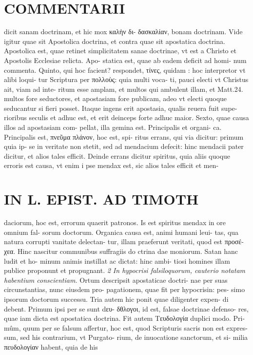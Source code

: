 \documentclass{article}
\begin{document}
\begin{pages}
\section*{COMMENTARII }
\marginpar{[ p.86 ]}\pstart dicit sanam doctrinam, et hic mox καλὴν δι- δασκαλίαν, bonam doctrinam. Vide igitur quae sit Apostolica doctrina, et contra quae sit apostatica doctrina. Apostolica est, quae retinet simplicitatem sanae doctrinae, vt est a Christo et Apostolis Ecclesiae relicta. Apo- statica est, quae ab eadem deficit ad homi- num commenta.  \pend\pstart Quinto, qui hoc facient? respondet, τίνες, quidam : hoc interpretor vt alibi loqui- tur Scriptura per πολλοὺς: quia multi voca- ti, pauci electi vt Christus ait, viam ad inte- ritum esse amplam, et multos qui ambulent illam, et Matt.24. multos fore seductores, et apostasiam fore publicam, adeo vt electi quoque seducantur si fieri posset. Itaque ingens erit apostasia, qualis reuera fuit supe- rioribus seculis et adhuc est, et erit deinceps forte adhuc maior.  \pend\pstart Sexto, quae causa illos ad apostasiam com- pellat, illa gemina est. Principalis et organi- ca. Principalis est, πνεῦμα πλάνον, hoc est, spi- ritus errans, qui via dicitur: primum quia ip- se in veritate non stetit, sed ad mendacium defecit: hinc mendacii pater dicitur, et alios tales efficit. Deinde errans dicitur spiritus, quia aliis quoque erroris est causa, vt enim i pse mendax est, sic alios tales efficit et men-  \pend
\section*{IN L. EPIST. AD TIMOTH }
\marginpar{[ p.87 ]}\pstart daciorum, hoc est, errorum quaerit patronos. Is est spiritus mendax in ore omnium fal- sorum doctorum.  \pend\pstart Organica causa est, animi humani leui- tas, qua natura corrupti vanitate delectan- tur, illam praeferunt veritati, quod est προσέ- χεα. Hinc nascitur communibus suffragiis do ctrina dae moniorum. Satan hanc ludit et ho- minum animis instillat ac dictat: hinc ambi- tiosi homines illam publice proponunt et propugnant.  \pend
\textit{2 In hypocrisi falsiloquorum, cauterio notatam habentium conscientiam. }\pstart Ortum descripsit apostaticae doctri- nae per suas circunstantias, nunc eiusdem pro- pagationem, quae fit per hypocrisin: pes- simo ipsorum doctorum successu. Tria autem hic ponit quae diligenter expen- di debent. Primum ipsi per se sunt dευ- δθλογοι, id est, falsae doctrinae defenso- res, quae iam dicta est apostatica doctrina. Fit autem Τευδολογία duplici modo. Pri- mûm, quum per se falsum affertur, hoc est, quod Scripturis sacris non est expres- sum, sed his contrarium, vt Purgato- rium, de inuocatione sanctorum, et si- milia πευδολογίαν habent, quia de his  \pend
\marginpar{[ p.88 ]}

\end{pages}
\end{document}

